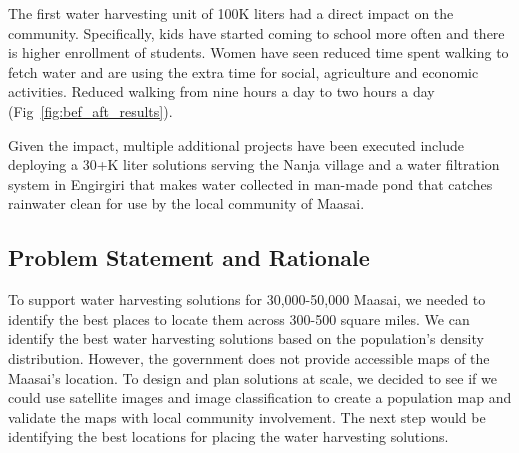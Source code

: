 \documentclass[10pt]{article}
\begin{document}
The first water harvesting unit of 100K liters had a direct impact on the community. Specifically, kids have started coming to school more often and there is higher enrollment of students. Women have seen reduced time spent walking to fetch water and are using the extra time for social, agriculture and economic activities. Reduced walking from nine hours a day to two hours a day (Fig~\ref{fig:bef_aft_results}). 

Given the impact, multiple additional projects have been executed include deploying a 30+K liter solutions serving the Nanja village and a water filtration system in Engirgiri that makes water collected in man-made pond that catches rainwater clean for use by the local community of Maasai.

\subsection{Problem Statement and Rationale}


To support water harvesting solutions for 30,000-50,000 Maasai, we needed to identify the best places to locate them across 300-500 square miles. We can identify the best water harvesting solutions based on the population's density distribution. However, the government does not provide accessible maps of the Maasai's location. To design and plan solutions at scale, we decided to see if we could use satellite images and image classification to create a population map and validate the maps with local community involvement. The next step would be identifying the best locations for placing the water harvesting solutions.




\end{document}

